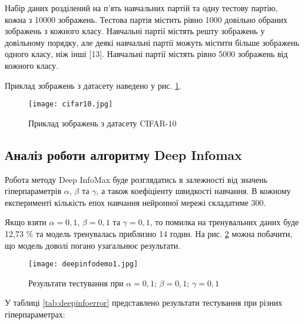 Набір даних розділений на п’ять навчальних партій та одну тестову партію, кожна з 10000 зображень. Тестова партія містить рівно 1000 довільно обраних зображень з кожного класу. Навчальні партії містять решту зображень у довільному порядку, але деякі навчальні партії можуть містити більше зображень одного класу, ніж інші [13]. Навчальні партії містять рівно 5000 зображень від кожного класу.

Приклад зображень з датасету наведено у рис. \ref{fig:cifar10}.

\vspace{-1em}

\begin{figure}[h]
  \texttt{[image: cifar10.jpg]}
  \caption{Приклад зображень з датасету CIFAR-10}
  \label{fig:cifar10}
\end{figure}

\subsection{Аналіз роботи алгоритму Deep Infomax}

Робота методу Deep InfoMax буде розглядатись в залежності від значень гіперпараметрів $\alpha$, $\beta$ та $\gamma$, а також коефіціенту швидкості навчання. В кожному експерименті кількість епох навчання нейронної мережі складатиме 300.

Якщо взяти $\alpha = 0,1$, $\beta = 0,1$ та $\gamma = 0,1$, то помилка на тренувальних даних буде 12,73 \% та модель тренувалась приблизно 14 годин.
На рис. \ref{fig:deepinfodemo1} можна побачити, що модель доволі погано узагальнює результати.

\newpage

\begin{figure}[h]
  \texttt{[image: deepinfodemo1.jpg]}
  \caption{Результати тестування при $\alpha = 0,1; \, \beta = 0,1; \, \gamma = 0,1$}
  \label{fig:deepinfodemo1}
\end{figure}

У таблиці \ref{tab:deepinfoerror} представлено результати тестування при різних гіперпараметрах:

